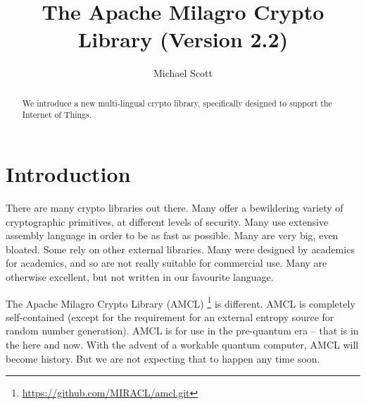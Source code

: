 \documentclass{llncs}
\begin{document}
\pagestyle{plain}

\title{The Apache Milagro Crypto Library (Version 2.2)}

\author{
Michael Scott 
}

\institute{}


\maketitle

\begin{abstract}

We introduce a new multi-lingual crypto library, specifically designed to support the Internet of Things.

\end{abstract} 

\section{Introduction}\label{sec:intro}


There are many crypto libraries out there. Many offer a bewildering variety of cryptographic primitives, at different levels of security. Many use extensive assembly language 
in order to be as fast as possible. Many are very big, even bloated. Some rely on other external libraries. Many were designed by academics for academics, and so are not really suitable for 
commercial use. Many are otherwise excellent, but not written in our favourite language.

The Apache Milagro Crypto Library (AMCL) \footnote{\url{https://github.com/MIRACL/amcl.git}} is different. AMCL is completely self-contained (except for the requirement for an external entropy source for random number generation). 
AMCL is for use in the pre-quantum era -- that is in the here and now. With 
the advent of a workable quantum computer, AMCL will become history. But we are not expecting that to happen any time soon.
\end{document}
